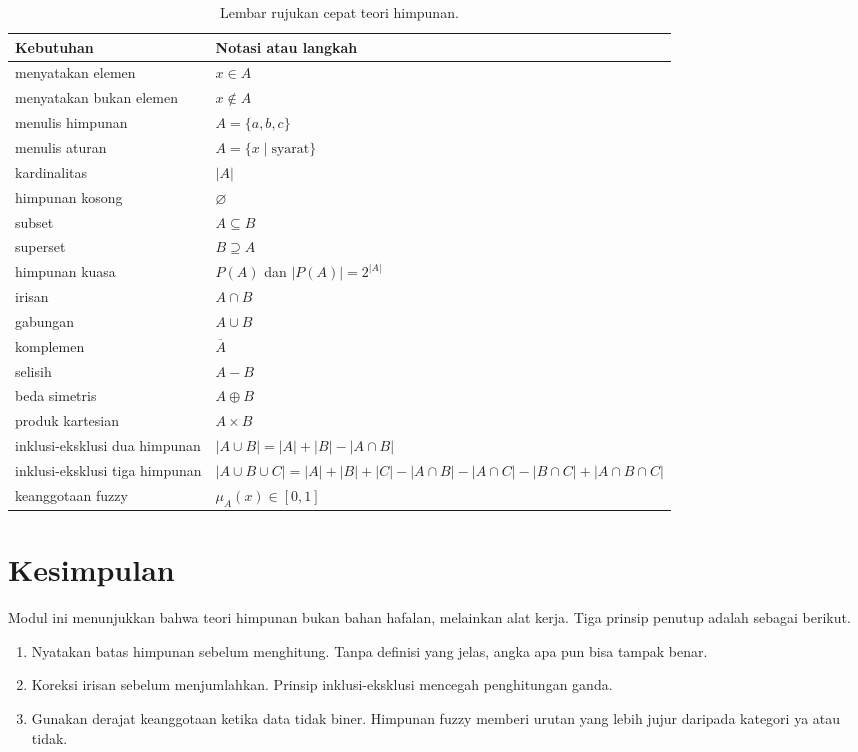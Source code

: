 \documentclass[11pt,a4paper]{article}
\begin{document}
\begin{table}[H]
	\centering
	\caption{Lembar rujukan cepat teori himpunan.}
	\label{tab:rujukan-cepat}
	\footnotesize
	\begin{tabularx}{\textwidth}{l X}
		\toprule
		Kebutuhan & Notasi atau langkah \\
		\midrule
		menyatakan elemen & $x \in A$ \\
		menyatakan bukan elemen & $x \notin A$ \\
		menulis himpunan & $A=\{a,b,c\}$ \\
		menulis aturan & $A=\{x \mid \text{syarat}\}$ \\
		kardinalitas & $|A|$ \\
		himpunan kosong & $\varnothing$ \\
		subset & $A \subseteq B$ \\
		superset & $B \supseteq A$ \\
		himpunan kuasa & $P(A)$ dan $|P(A)|=2^{|A|}$ \\
		irisan & $A \cap B$ \\
		gabungan & $A \cup B$ \\
		komplemen & $\overline{A}$ \\
		selisih & $A-B$ \\
		beda simetris & $A \oplus B$ \\
		produk kartesian & $A \times B$ \\
		inklusi-eksklusi dua himpunan & $|A \cup B|=|A|+|B|-|A \cap B|$ \\
		inklusi-eksklusi tiga himpunan & $|A \cup B \cup C|=|A|+|B|+|C|-|A \cap B|-|A \cap C|-|B \cap C|+|A \cap B \cap C|$ \\
		keanggotaan fuzzy & $\mu_A(x) \in [0,1]$ \\
		\bottomrule
	\end{tabularx}
\end{table}

\section{Kesimpulan}

Modul ini menunjukkan bahwa teori himpunan bukan bahan hafalan, melainkan alat kerja. Tiga prinsip penutup adalah sebagai berikut.

\begin{enumerate}
	\item Nyatakan batas himpunan sebelum menghitung. Tanpa definisi yang jelas, angka apa pun bisa tampak benar.
	\item Koreksi irisan sebelum menjumlahkan. Prinsip inklusi-eksklusi mencegah penghitungan ganda.
	\item Gunakan derajat keanggotaan ketika data tidak biner. Himpunan fuzzy memberi urutan yang lebih jujur daripada kategori ya atau tidak.
\end{enumerate}
\end{document}
